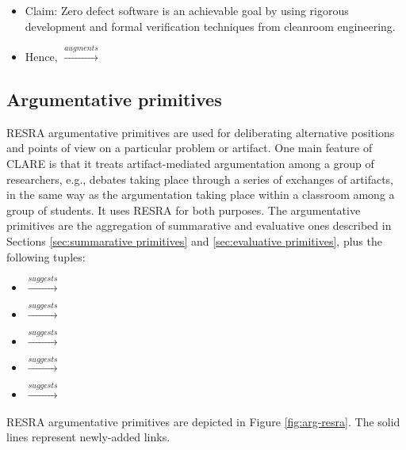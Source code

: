 \begin{itemize}
{\begin{itemize}
\item {\sf Claim:} Zero defect software is an achievable goal by using
  rigorous development and formal verification techniques from cleanroom
  engineering.

\item Hence,  \(
  \stackrel{augments}{\longrightarrow} \) 
\end{itemize}
\normalsize

\subsection{Argumentative primitives}
\label{sec:argumentative primitives}

RESRA argumentative primitives are used for deliberating alternative
positions and points of view on a particular problem or artifact. One main
feature of CLARE is that it treats artifact-mediated argumentation among a
group of researchers, e.g., debates taking place through a series of
exchanges of artifacts, in the same way as the argumentation taking place
within a classroom among a group of students. It uses RESRA for both
purposes. The argumentative primitives are the aggregation of summarative
and evaluative ones described in Sections \ref{sec:summarative primitives}
and \ref{sec:evaluative primitives}, plus the following tuples:

\begin{itemize}
   \item {} \( \stackrel{suggests}{\longrightarrow} \)
  
 \item {} \( \stackrel{suggests}{\longrightarrow} \)

 \item {} \( \stackrel{suggests}{\longrightarrow} \)

   \item {} \( \stackrel{suggests}{\longrightarrow} \)

\item {} \( \stackrel{suggests}{\longrightarrow} \)
\end{itemize}


\paragraph{}RESRA argumentative primitives are depicted in Figure
\ref{fig:arg-resra}. The solid lines represent newly-added links.

}
\end{itemize}
